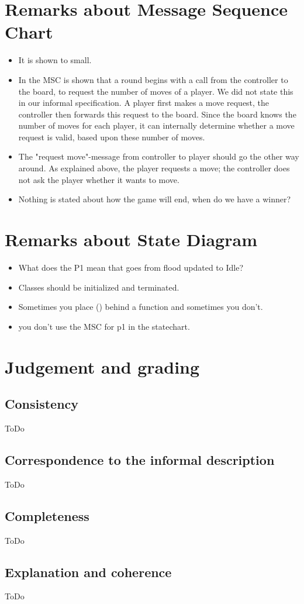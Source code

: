 \documentclass[a4paper,11pt]{article}
\begin{document}
    \section{Remarks about Message Sequence Chart}
    \begin{itemize}
        \item It is shown to small.
        \item In the MSC is shown that a round begins with a call from the controller to the board, to request the number of moves of a player. We did not state this in our informal specification. A player first makes a move request, the controller then forwards this request to the board. Since the board knows the number of moves for each player, it can internally determine whether a move request is valid, based upon these number of moves.
        \item The "request move"-message from controller to player should go the other way around. As explained above, the player requests a move; the controller does not ask the player whether it wants to move.
        \item Nothing is stated about how the game will end, when do we have a winner?
    \end{itemize}
    
    \section{Remarks about State Diagram}
    \begin{itemize}
        \item What does the P1 mean that goes from flood updated to Idle?
        \item Classes should be initialized and terminated.
        \item Sometimes you place () behind a function and sometimes you don't.
        \item you don't use the MSC for p1 in the statechart.
    \end{itemize}

    \section{Judgement and grading}
    \subsection{Consistency}
    ToDo

    \subsection{Correspondence to the informal description}
    ToDo

    \subsection{Completeness}
    ToDo

    \subsection{Explanation and coherence}
    ToDo
\end{document}
